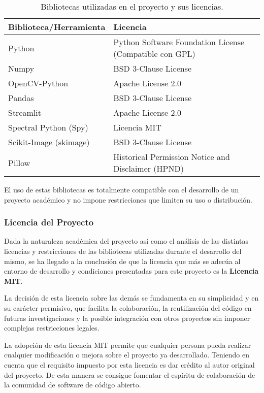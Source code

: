 \begin{table}[ht!]
\centering
\begin{tabular}{|l|l|}
\hline
\textbf{Biblioteca/Herramienta} & \textbf{Licencia} \\
\hline
Python & Python Software Foundation License (Compatible con GPL) \\
Numpy & BSD 3-Clause License \\
OpenCV-Python & Apache License 2.0 \\
Pandas & BSD 3-Clause License \\
Streamlit & Apache License 2.0 \\
Spectral Python (Spy) & Licencia MIT \\
Scikit-Image (skimage) & BSD 3-Clause License \\
Pillow & Historical Permission Notice and Disclaimer (HPND) \\
\hline
\end{tabular}
\caption{Bibliotecas utilizadas en el proyecto y sus licencias.}
\end{table}

El uso de estas bibliotecas es totalmente compatible con el desarrollo de un proyecto académico y no impone restricciones que limiten su uso o distribución.

\subsubsection{Licencia del Proyecto}
Dada la naturaleza académica del proyecto así como el análisis de las distintas licencias y restricciones de las bibliotecas utilizadas durante el desarrollo del mismo, se ha llegado a la conclusión de que la licencia que más se adecúa al entorno de desarrollo y condiciones presentadas para este proyecto es la \textbf{Licencia MIT}.

La decisión de esta licencia sobre las demás se fundamenta en su simplicidad y en su carácter permisivo, que facilita la colaboración, la reutilización del código en futuras investigaciones y la posible integración con otros proyectos sin imponer complejas restricciones legales.

La adopción de esta licencia MIT permite que cualquier persona pueda realizar cualquier modificación o mejora sobre el proyecto ya desarrollado. Teniendo en cuenta que el requisito impuesto por esta licencia es dar crédito al autor original del proyecto. De esta manera se consigue fomentar el espíritu de colaboración de la comunidad de software de código abierto.



